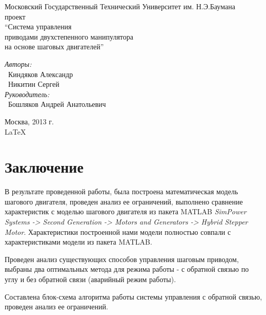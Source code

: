 \documentclass{article}
\begin{document}
\begin{titlepage}
\begin{center}
    {\large Московский Государственный Технический Университет им. Н.Э.Баумана}
    \\[50mm]
    { проект}
    \\[7mm]
    {\LARGE ``Система управления \\ приводами двухстепенного манипулятора \\ на основе шаговых двигателей''}
    \\[37mm]

    \begin{flushright}
        \begin{minipage}{0.5\textwidth}
            \begin{flushleft}
                \textit{Авторы:} \\
                ~Киндяков Александр \\
                ~Никитин Сергей \\[10mm]
                \textit{Руководитель:} \\
                ~Бошляков Андрей Анатольевич
            \end{flushleft}
        \end{minipage}
    \end{flushright}

    \vfill %
    Москва, 2013 г. \\
    \LaTeX
\end{center}
\end{titlepage}

\tableofcontents
\newpage







\newpage

\section{Заключение}

В результате проведенной работы, была построена математическая модель шагового двигателя, проведен
анализ ее ограничений, выполнено сравнение характеристик с моделью шагового двигателя из пакета MATLAB
\textit{SimPower Systems -> Second Generation -> Motors and Generators -> Hybrid Stepper Motor}.
Характеристики построенной нами модели полностью совпали с характеристиками модели из пакета MATLAB.

Проведен анализ существующих способов управления шаговым приводом, выбраны два оптимальных метода для
режима работы - с обратной связью по углу и без обратной связи (аварийный режим работы).

Составлена блок-схема алгоритма работы системы управления с обратной связью, проведен анализ ее
ограничений.


\end{document}

